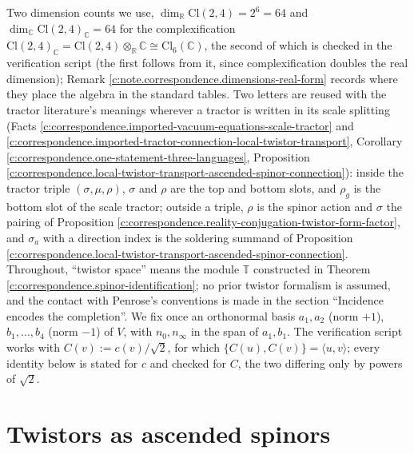 \documentclass[11pt]{article}
\theoremstyle{definition}
\theoremstyle{plain}
\providecommand{\C}{}\renewcommand{\C}{\mathbb{C}}
\providecommand{\Cl}{}\renewcommand{\Cl}{\mathrm{Cl}}
\providecommand{\R}{}\renewcommand{\R}{\mathbb{R}}
\providecommand{\T}{}\renewcommand{\T}{\mathbb{T}}
\providecommand{\nInf}{}\renewcommand{\nInf}{n_\infty}
\providecommand{\nO}{}\renewcommand{\nO}{n_0}
\providecommand{\ip}{}\renewcommand{\ip}[2]{\langle #1, #2\rangle}
\begin{document}
\label{c:note.correspondence.setting-setting-imports-2}
Two dimension counts we use, $\dim_\R \Cl(2,4) = 2^6 = 64$ and $\dim_\C \Cl(2,4)_\C = 64$ for the complexification $\Cl(2,4)_\C = \Cl(2,4)\otimes_\R\C \cong \Cl_6(\C)$, the second of which is checked in the verification script (the first follows from it, since complexification doubles the real dimension); Remark \ref{c:note.correspondence.dimensions-real-form} records where they place the algebra in the standard tables. Two letters are reused with the tractor literature's meanings wherever a tractor is written in its scale splitting (Facts \ref{c:correspondence.imported-vacuum-equations-scale-tractor} and \ref{c:correspondence.imported-tractor-connection-local-twistor-transport}, Corollary \ref{c:correspondence.one-statement-three-languages}, Proposition \ref{c:correspondence.local-twistor-transport-ascended-spinor-connection}): inside the tractor triple $(\sigma, \mu, \rho)$, $\sigma$ and $\rho$ are the top and bottom slots, and $\rho_g$ is the bottom slot of the scale tractor; outside a triple, $\rho$ is the spinor action and $\sigma$ the pairing of Proposition \ref{c:correspondence.reality-conjugation-twistor-form-factor}, and $\sigma_a$ with a direction index is the soldering summand of Proposition \ref{c:correspondence.local-twistor-transport-ascended-spinor-connection}. Throughout, ``twistor space'' means the module $\T$ constructed in Theorem \ref{c:correspondence.spinor-identification}; no prior twistor formalism is assumed, and the contact with Penrose's conventions is made in the section ``Incidence encodes the completion''. We fix once an orthonormal basis $a_1, a_2$ (norm $+1$), $b_1, \dots, b_4$ (norm $-1$) of $V$, with $\nO, \nInf$ in the span of $a_1, b_1$. The verification script works with $C(v) := c(v)/\sqrt2$, for which $\{C(u), C(v)\} = \ip{u}{v}$; every identity below is stated for $c$ and checked for $C$, the two differing only by powers of $\sqrt2$.

\section{Twistors as ascended spinors}
\end{document}
